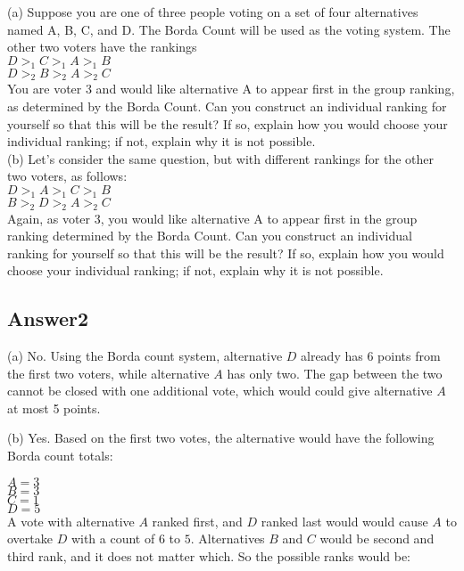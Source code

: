 \documentclass[twoside]{article}
\begin{document}
(a) Suppose you are one of three people voting on a set of four alternatives named A, B, C, and D. The Borda Count will be used as the voting system. The other two voters have the rankings \\

$D >_{1} C >_{1} A >_{1} B$ \\
$D >_{2} B >_{2} A >_{2} C$ \\

You are voter 3 and would like alternative A to appear first in the group ranking, as determined by the Borda Count. Can you construct an individual ranking for yourself so that this will be the result? If so, explain how you would choose your individual ranking; if not, explain why it is not possible. \\

(b) Let’s consider the same question, but with different rankings for the other two voters, as follows: \\

$D >_{1} A >_{1} C >_{1} B$ \\
$B >_{2} D >_{2} A >_{2} C$ \\

Again, as voter 3, you would like alternative A to appear first in the group ranking determined by the Borda Count. Can you construct an individual ranking for yourself so that this will be the result? If so, explain how you would choose your individual ranking; if not, explain why it is not possible.

\subsection{Answer2}

(a) No. Using the Borda count system, alternative $D$ already has 6 points from the first two voters, while alternative $A$ has only two. The gap between the two cannot be closed with one additional vote, which would could give alternative $A$ at most 5 points.  

(b) Yes. Based on the first two votes, the alternative would have the following Borda count totals:

$A = 3$\\
$B = 3$\\
$C = 1$\\
$D = 5$\\

A vote with alternative $A$ ranked first, and $D$ ranked last would would cause $A$ to overtake $D$ with a count of $6$ to $5$. Alternatives $B$ and $C$ would be second and third rank, and it does not matter which. So the possible ranks would be:
\end{document}
